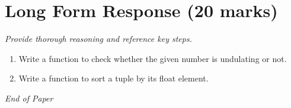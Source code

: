 \documentclass[12pt]{article}
\begin{document}
\section*{Long Form Response (20 marks)}
\textit{Provide thorough reasoning and reference key steps.}
\begin{enumerate}[label=\arabic*.]
\item Write a function to check whether the given number is undulating or not.
\item Write a function to sort a tuple by its float element.
\end{enumerate}

\vfill
\noindent\textit{End of Paper}
\end{document}

